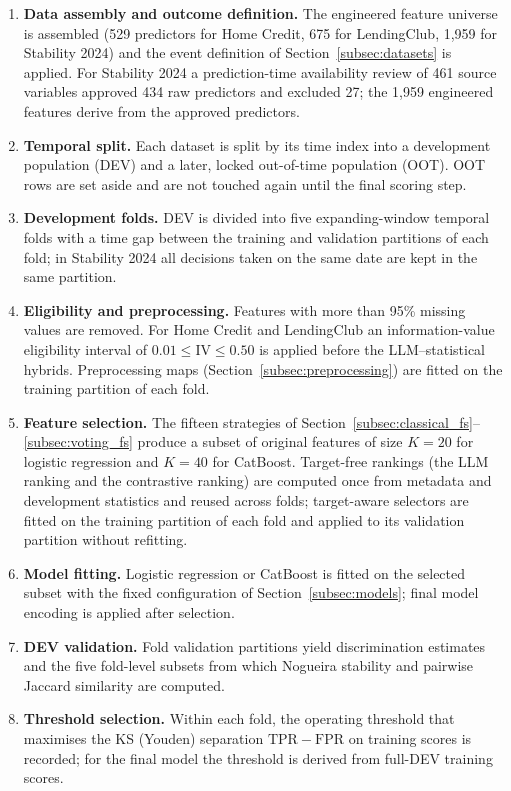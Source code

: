 \documentclass[preprint,12pt]{elsarticle}
\newcommand{\Kfeat}{K}
\newcommand{\TPR}{\mathrm{TPR}}
\newcommand{\FPR}{\mathrm{FPR}}
\begin{document}
\begin{enumerate}
    \item \textbf{Data assembly and outcome definition.} The engineered feature universe is assembled (529 predictors for Home Credit, 675 for LendingClub, 1,959 for Stability 2024) and the event definition of Section~\ref{subsec:datasets} is applied. For Stability 2024 a prediction-time availability review of 461 source variables approved 434 raw predictors and excluded 27; the 1,959 engineered features derive from the approved predictors.
    \item \textbf{Temporal split.} Each dataset is split by its time index into a development population (DEV) and a later, locked out-of-time population (OOT). OOT rows are set aside and are not touched again until the final scoring step.
    \item \textbf{Development folds.} DEV is divided into five expanding-window temporal folds with a time gap between the training and validation partitions of each fold; in Stability 2024 all decisions taken on the same date are kept in the same partition.
    \item \textbf{Eligibility and preprocessing.} Features with more than 95\% missing values are removed. For Home Credit and LendingClub an information-value eligibility interval of $0.01\le\mathrm{IV}\le0.50$ is applied before the LLM--statistical hybrids. Preprocessing maps (Section~\ref{subsec:preprocessing}) are fitted on the training partition of each fold.
    \item \textbf{Feature selection.} The fifteen strategies of Section~\ref{subsec:classical_fs}--\ref{subsec:voting_fs} produce a subset of original features of size $\Kfeat=20$ for logistic regression and $\Kfeat=40$ for CatBoost. Target-free rankings (the LLM ranking and the contrastive ranking) are computed once from metadata and development statistics and reused across folds; target-aware selectors are fitted on the training partition of each fold and applied to its validation partition without refitting.
    \item \textbf{Model fitting.} Logistic regression or CatBoost is fitted on the selected subset with the fixed configuration of Section~\ref{subsec:models}; final model encoding is applied after selection.
    \item \textbf{DEV validation.} Fold validation partitions yield discrimination estimates and the five fold-level subsets from which Nogueira stability and pairwise Jaccard similarity are computed.
    \item \textbf{Threshold selection.} Within each fold, the operating threshold that maximises the KS (Youden) separation $\TPR-\FPR$ on training scores is recorded; for the final model the threshold is derived from full-DEV training scores.

\end{enumerate}
\end{document}
